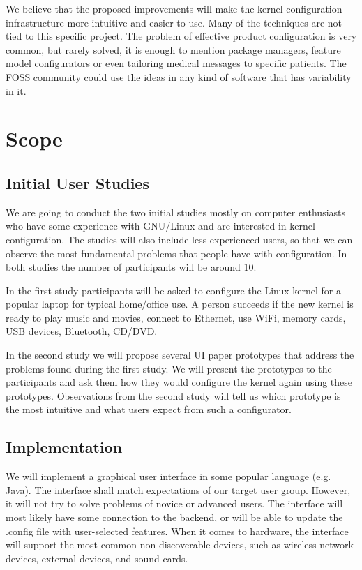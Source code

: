 \documentclass{chi2009}
\begin{document}
We believe that the proposed improvements will make the kernel configuration infrastructure more intuitive and easier to use. Many of the techniques are not tied to this specific project. The problem of effective product configuration is very common, but rarely solved, it is enough to mention package managers, feature model configurators or even tailoring medical messages to specific patients. The FOSS community could use the ideas in any kind of software that has variability in it.

\section{Scope}

\subsection{Initial User Studies}
We are going to conduct the two initial studies mostly on computer enthusiasts who have some experience with GNU/Linux and are interested in kernel configuration. The studies will also include less experienced users, so that we can observe the most fundamental problems that people have with configuration. In both studies the number of participants will be around 10.

In the first study participants will be asked to configure the Linux kernel for a popular laptop for typical home/office use. A person succeeds if the new kernel is ready to play music and movies, connect to Ethernet, use WiFi, memory cards, USB devices, Bluetooth, CD/DVD.

In the second study we will propose several UI paper prototypes that address the problems found during the first study. We will present the prototypes to the participants and ask them how they would configure the kernel again using these prototypes. Observations from the second study will tell us which prototype is the most intuitive and what users expect from such a configurator.

\subsection{Implementation}

We will implement a graphical user interface in some popular language (e.g. Java). The interface shall match expectations of our target user group. However, it will not try to solve problems of novice or advanced users. The interface will most likely have some connection to the backend, or will be able to update the \textsf{.config} file with user-selected features. When it comes to hardware, the interface will support the most common non-discoverable devices, such as wireless network devices, external devices, and sound cards.
\end{document}
